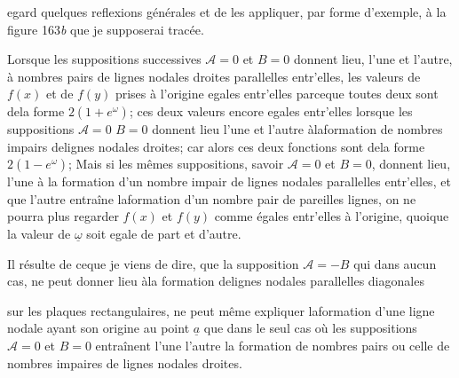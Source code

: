 \documentclass[11pt,a4paper]{article}
\begin{document}

egard quelques reflexions générales et de les appliquer,
par forme d'exemple, à la figure 163\emph{b} que je supposerai
tracée.

Lorsque les suppositions successives $\mathcal{A}=0$ et $B=0$ donnent
lieu, l'une et l'autre, à   nombres pairs de lignes
nodales droites parallelles entr'elles, les valeurs de $f(x)$ et de
$f(y)$  prises à l'origine    egales entr'elles
parceque toutes deux sont dela forme $2(1+e^{\omega})$; ces deux
valeurs   encore  egales entr'elles lorsque les suppositions
$\mathcal{A}=0$  $B=0$ donnent lieu l'une et l'autre àlaformation
de  nombres impairs delignes nodales droites; car alors
ces deux fonctions sont dela forme $2(1-e^{\omega})$; Mais si les
mêmes suppositions, savoir $\mathcal{A}=0$ et $B=0$, donnent lieu, l'une
à la formation d'un nombre impair de lignes nodales
parallelles entr'elles, et que l'autre entraîne laformation
d'un nombre pair de pareilles lignes, on ne pourra
plus regarder $f(x)$ et $f(y)$ comme égales entr'elles à
l'origine,  quoique la valeur de $\underline{\omega}$ soit egale
de part et d'autre.

Il résulte de ceque je viens de dire, que la supposition
$\mathcal{A}=-B$ qui dans aucun cas,  ne peut donner lieu
àla formation delignes nodales parallelles  diagonales


sur les plaques rectangulaires, ne peut même expliquer laformation
d'une ligne nodale ayant son origine au point $\underline{a}$ que
dans le seul cas où les suppositions $\mathcal{A}=0$ et $B=0$ entraînent
l'une   l'autre la formation de nombres pairs
ou celle de nombres impaires de lignes nodales droites.
\end{document}
